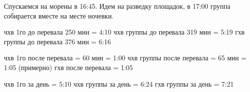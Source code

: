 Спускаемся на морены в 16:45. Идем на разведку площадок, в 17:00 группа собирается вместе на месте ночевки.













чхв 1го до перевала 250 мин = 4:10
чхв группы до перевала 319 мин = 5:19
гхв группы до перевала 376 мин = 6:16

чхв 1го после перевала = 60 мин = 1:00
чхв группы после перевала = 65 мин = 1:05 (примерно)
гхв после перевала = 1:05

чхв 1го за день = 5:10
чхв группы за день = 6:24
гхв группы за день = 7:21

    \FloatBarrier
